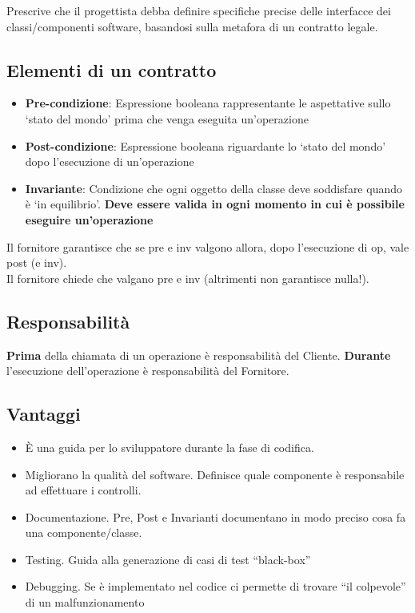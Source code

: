 Prescrive che il progettista debba definire specifiche precise delle interfacce dei classi/componenti software, basandosi sulla metafora di un contratto legale.

\subsection{Elementi di un contratto}
\begin{itemize}
    \item \textbf{Pre-condizione}: Espressione booleana rappresentante le aspettative sullo ‘stato del mondo’ prima che venga eseguita un’operazione
    \item \textbf{Post-condizione}: Espressione booleana riguardante lo ‘stato del mondo’ dopo l’esecuzione di un’operazione
    \item \textbf{Invariante}: Condizione che ogni oggetto della classe deve soddisfare quando è ‘in equilibrio’. \textbf{Deve essere  valida in ogni momento in cui è possibile eseguire un’operazione}
\end{itemize}

\noindent Il fornitore garantisce che se pre e inv valgono allora, dopo l’esecuzione di op, vale post (e inv).\\
Il fornitore chiede che valgano pre e inv (altrimenti non garantisce nulla!).

\subsection{Responsabilità}
\textbf{Prima} della chiamata di un operazione è responsabilità del Cliente.
\textbf{Durante} l’esecuzione dell’operazione è responsabilità del Fornitore.

\subsection{Vantaggi}
\begin{itemize}
    \item \`E una guida per lo sviluppatore durante la fase di codifica.
    \item Migliorano la qualità del software. Definisce quale componente è responsabile ad effettuare i controlli.
    \item Documentazione. Pre, Post e Invarianti documentano in modo preciso cosa fa una componente/classe.
    \item Testing. Guida alla generazione di casi di test “black-box”
    \item Debugging. Se è implementato nel codice ci permette di trovare “il colpevole” di un malfunzionamento
\end{itemize}
